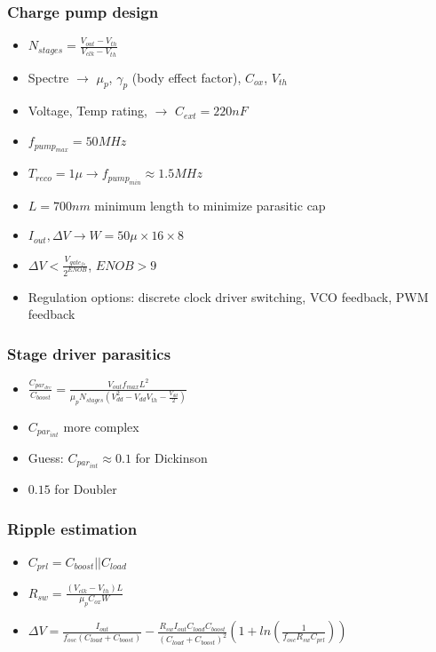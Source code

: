 \documentclass[aspectratio=169]{beamer}
\begin{document}
\begin{frame}
    \frametitle{Charge pump design}
        \begin{itemize}
            \item $N_{\scriptscriptstyle stages} = \frac{V_{\scriptscriptstyle out} - V_{\scriptscriptstyle th}}{V_{\scriptscriptstyle clk} - V_{\scriptscriptstyle th}}$
            \item Spectre $\rightarrow$ $\mu_{p}$, $\gamma_{p}$ (body effect factor), $C_{ox}$, $V_{th}$
            \item Voltage, Temp rating, $\rightarrow$ $C_{\scriptscriptstyle ext} = 220nF$
            \item $f_{pump_{max}} = 50MHz$
            \item $T_{reco} = 1\mu \rightarrow f_{pump_{min}} \approx 1.5MHz$
            \item $L = 700nm$ minimum length to minimize parasitic cap
            \item $I_{out}, \Delta V \rightarrow W = 50\mu \times 16 \times 8$
            \item $\Delta V < \frac{V_{gate_{fs}}}{2 ^ {ENOB}}$, $ENOB > 9$
            \item Regulation options: discrete clock driver switching, VCO feedback, PWM feedback
        \end{itemize}
\end{frame}

\begin{frame}
    \frametitle{Stage driver parasitics}
        \begin{itemize}
            \item $\frac{C_{par_{drv}}}{C_{boost}} = \frac{V_{out} f_{max} L^2}{\mu_{p} N_{stages} (V_{dd} ^ 2 - V_{dd} V_{th} - \frac{V_{dd}}{2})}$
            \item $C_{par_{int}}$ more complex
            \item Guess: $C_{par_{int}} \approx 0.1$ for Dickinson
            \item $0.15$ for Doubler
        \end{itemize}
\end{frame}

\begin{frame}
    \frametitle{Ripple estimation}
        \begin{itemize}
            \item $C_{prl} = C_{boost} || C_{load}$
            \item $R_{sw} = \frac{(V_{clk} - V_{th}) L}{\mu_{p} C_{ox} W}$
            \item $\Delta V = \frac{I_{out}}{f_{osc}(C_{load} + C_{boost})} - \frac{R_{sw} I_{out} C_{load} C_{boost}}{(C_{load} + C_{boost})^2} \left(1 + ln(\frac{1}{f_{osc} R_{sw} C_{prl}})\right)$
        \end{itemize}
\end{frame}
\end{document}
